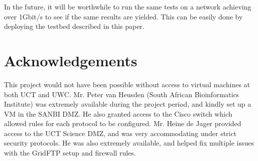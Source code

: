 \documentclass{sig-alternate-05-2015}
\begin{document}
In the future, it will be worthwhile to run the same tests on a network achieving over 1Gbit/s to see if the same results are yielded. This can be easily done by deploying the testbed described in this paper.

\section{Acknowledgements}
This project would not have been possible without access to virtual machines at both UCT and UWC. Mr. Peter van Heusden (South African Bioinformatics Institute) was extremely available during the project period, and kindly set up a VM in the SANBI DMZ. He also granted access to the Cisco switch which allowed rules for each protocol to be configured. Mr. Heine de Jager provided access to the UCT Science DMZ, and was very accommodating under strict security protocols. He was also extremely available, and helped fix multiple issues with the GridFTP setup and firewall rules.



\end{document}
